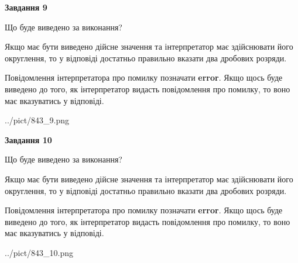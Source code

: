 \documentclass[12pt, ukrainian]{article}
\begin{document}
{\begin {Large}
{\begin {center}\textbf{Завдання 9}\end {center}}\par
Що буде виведено за виконання? \par

Якщо має бути виведено дійсне значення та інтерпретатор має здійснювати його округлення, 
то у відповіді достатньо правильно вказати два дробових розряди.

Повідомлення інтерпретатора про помилку позначати \textbf{error}.
Якщо щось буде виведено до того, як інтерпретатор видасть повідомлення про помилку, 
то воно має вказуватись у відповіді. \par

\begin{center}
	{../pict/843_9.png}
\end{center}
\newpage

{\begin {center}\textbf{Завдання 10}\end {center}}\par
Що буде виведено за виконання? \par

Якщо має бути виведено дійсне значення та інтерпретатор має здійснювати його округлення, 
то у відповіді достатньо правильно вказати два дробових розряди.

Повідомлення інтерпретатора про помилку позначати \textbf{error}.
Якщо щось буде виведено до того, як інтерпретатор видасть повідомлення про помилку, 
то воно має вказуватись у відповіді. \par

\begin{center}
	{../pict/843_10.png}
\end{center}
\newpage

\end {Large}}
\end{document}
